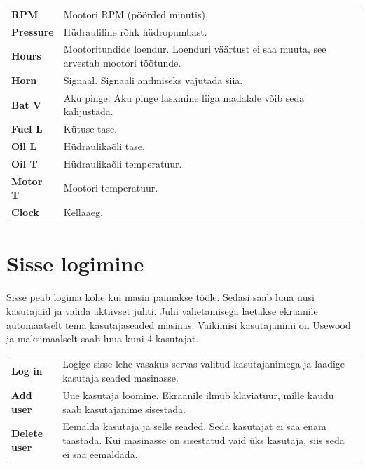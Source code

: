 \documentclass[12pt,a4paper,english]{uvmanual}
\begin{document}
\begin{tabular}{ L{0.2\textwidth} L{0.66\textwidth} }
\textbf{RPM} & Mootori RPM (pöörded minutis) \\
\textbf{Pressure} & Hüdrauliline rõhk hüdropumbast. \\
\textbf{Hours} & Mootoritundide loendur. Loenduri väärtust ei saa muuta, see arvestab mootori töötunde.  \\
\textbf{Horn} & Signaal. Signaali andmiseks vajutada siia. \\
\textbf{Bat V} & Aku pinge. Aku pinge laskmine liiga madalale võib seda kahjustada. \\
\textbf{Fuel L} & Kütuse tase. \\
\textbf{Oil L} & Hüdraulikaõli tase. \\
\textbf{Oil T} & Hüdraulikaõli temperatuur. \\
\textbf{Motor T} & Mootori temperatuur. \\
\textbf{Clock} & Kellaaeg. \\
\end{tabular}


\chapter{Sisse logimine}\label{ch:login}

Sisse peab logima kohe kui masin pannakse tööle. Sedasi saab luua uusi kasutajaid ja valida aktiivset juhti. Juhi vahetamisega laetakse ekraanile automaatselt tema kasutajaseaded masinas. Vaikimisi kasutajanimi on Usewood ja maksimaalselt saab luua kuni 4 kasutajat.


\begin{tabular}{ L{0.2\textwidth} L{0.66\textwidth} }
\textbf{Log in} & Logige sisse lehe vasakus servas valitud kasutajanimega ja laadige kasutaja seaded masinasse. \\
\textbf{Add user} & Uue kasutaja loomine. Ekraanile ilmub klaviatuur, mille kaudu saab kasutajanime sisestada.  \\
\textbf{Delete user} & Eemalda kasutaja ja selle seaded. Seda kasutajat ei saa enam taastada. Kui masinasse on sisestatud vaid üks kasutaja, siis seda ei saa eemaldada. \\
\end{tabular}
\end{document}
